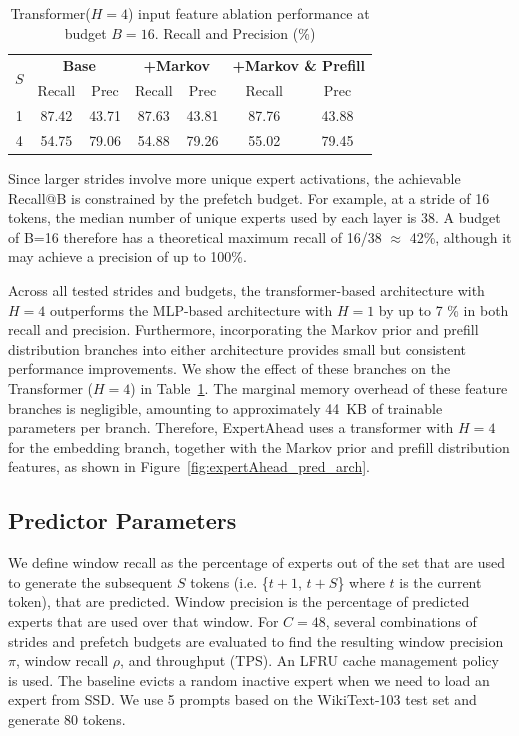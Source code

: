 \begin{table}[h]
\centering
\caption{Transformer($H=4$) input feature ablation performance at budget $B=16$. Recall and Precision (\%)}
\label{tab:transformer_h4_ablation_b16}
\begin{tabular}{c|cc|cc|cc}
\toprule
\multirow{2}{*}{$S$} & \multicolumn{2}{c|}{\textbf{Base}} & \multicolumn{2}{c|}{\textbf{+Markov}} & \multicolumn{2}{c}{\textbf{+Markov \& Prefill}} \\
& Recall & Prec & Recall & Prec & Recall & Prec \\
\midrule
1 & 87.42 & 43.71 & 87.63 & 43.81 & 87.76 & 43.88 \\
4 & 54.75 & 79.06 & 54.88 & 79.26 & 55.02 & 79.45 \\
\bottomrule
\end{tabular}

\end{table}

Since larger strides involve more unique expert activations, the achievable Recall@B is constrained by the prefetch budget. For example, at a stride of 16 tokens, the median number of unique experts used by each layer is 38.
A budget of B=16 therefore has a theoretical maximum recall of 16/38 $\approx$ 42\%, although it may achieve a precision of up to 100\%.

Across all tested strides and budgets, the transformer-based architecture with $H=4$ outperforms the MLP-based architecture with $H=1$ by up to 7 \% in both recall and precision. Furthermore, incorporating the Markov prior and prefill distribution branches into either architecture provides small but consistent performance improvements. We show the effect of these branches on the Transformer ($H=4$) in Table~\ref{tab:transformer_h4_ablation_b16}. The marginal memory overhead of these feature branches is negligible, amounting to approximately 44~KB of trainable parameters per branch. Therefore, ExpertAhead uses a transformer with $H=4$ for the embedding branch, together with the Markov prior and prefill distribution features, as shown in Figure~\ref{fig:expertAhead_pred_arch}.

\subsection{Predictor Parameters} \label{sec:predictor_stride}
We define window recall as the percentage of experts out of the set that are used to generate the subsequent $S$ tokens (i.e. \{$t+1$, $t+S$\} where $t$ is the current token), that are predicted. Window precision is the percentage of predicted experts that are used over that window. For $C=48$, several combinations of strides and prefetch budgets are evaluated to find the resulting window precision $\pi$, window recall $\rho$, and throughput (TPS). An LFRU cache management policy is used. The baseline evicts a random inactive expert when we need to load an expert from SSD. We use 5 prompts based on the WikiText-103 test set and generate 80 tokens.




